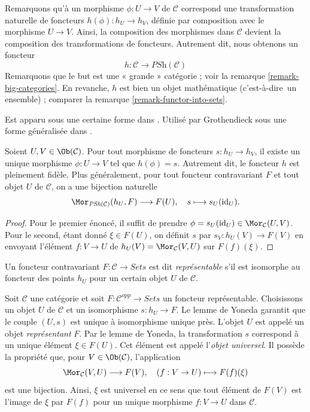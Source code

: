 \noindent
Remarquons qu'à un morphisme $\phi : U \to V$ de $\mathcal{C}$ correspond
une transformation naturelle de foncteurs $h(\phi) : h_U \to h_V$,
définie par composition avec le morphisme $U \to V$. Ainsi,
la composition des morphismes dans $\mathcal{C}$ devient la composition
des transformations de foncteurs. Autrement dit, nous obtenons un foncteur
$$
h :
\mathcal{C}
\longrightarrow
\textit{PSh}(\mathcal{C})
$$
Remarquons que le but est une « grande » catégorie ; voir la
remarque \ref{remark-big-categories}. En revanche,
$h$ est bien un objet mathématique (c'est-à-dire\ un ensemble) ; comparer
la remarque \ref{remark-functor-into-sets}.

\begin{lemma}
\label{lemma-yoneda}
\begin{reference}
Est apparu sous une certaine forme dans \cite{Yoneda-homology}. Utilisé par
Grothendieck sous une forme généralisée dans \cite{Gr-II}.
\end{reference}
Soient $U, V \in \Ob(\mathcal{C})$.
Pour tout morphisme de foncteurs $s : h_U \to h_V$,
il existe un unique morphisme $\phi : U \to V$
tel que $h(\phi) = s$. Autrement dit, le
foncteur $h$ est pleinement fidèle. Plus généralement,
pour tout foncteur contravariant $F$ et tout objet
$U$ de $\mathcal{C}$, on a une bijection naturelle
$$
\Mor_{\textit{PSh}(\mathcal{C})}(h_U, F) \longrightarrow F(U),
\quad
s \longmapsto s_U(\text{id}_U).
$$
\end{lemma}

\begin{proof}
Pour le premier énoncé, il suffit de prendre
$\phi = s_U(\text{id}_U) \in \Mor_\mathcal{C}(U, V)$.
Pour le second, étant donné $\xi \in F(U)$, on définit
$s$ par $s_V : h_U(V) \to F(V)$ en envoyant l'élément $f : V \to U$
de $h_U(V) = \Mor_\mathcal{C}(V, U)$ sur $F(f)(\xi)$.
\end{proof}

\begin{definition}
\label{definition-representable-functor}
Un foncteur contravariant $F : \mathcal{C}\to \textit{Sets}$ est dit
{\it représentable} s'il est isomorphe au foncteur des points
$h_U$ pour un certain objet $U$ de $\mathcal{C}$.
\end{definition}

\noindent
Soit $\mathcal{C}$ une catégorie et soit
$F : \mathcal{C}^{opp} \to \textit{Sets}$ un foncteur représentable.
Choisissons un objet $U$ de $\mathcal{C}$ et un isomorphisme $s : h_U \to F$.
Le lemme de Yoneda garantit que le couple $(U, s)$
est unique à isomorphisme unique près. L'objet
$U$ est appelé un objet {\it représentant} $F$.
Par le lemme de Yoneda, la transformation $s$ correspond à un unique
élément $\xi \in F(U)$. Cet élément est appelé l'{\it objet universel}.
Il possède la propriété que, pour $V \in \Ob(\mathcal{C})$, l'application
$$
\Mor_\mathcal{C}(V, U) \longrightarrow F(V),\quad
(f : V \to U) \longmapsto F(f)(\xi)
$$
est une bijection. Ainsi, $\xi$ est universel en ce sens que tout élément
de $F(V)$ est l'image de $\xi$ par $F(f)$ pour un unique morphisme
$f : V \to U$ dans $\mathcal{C}$.






